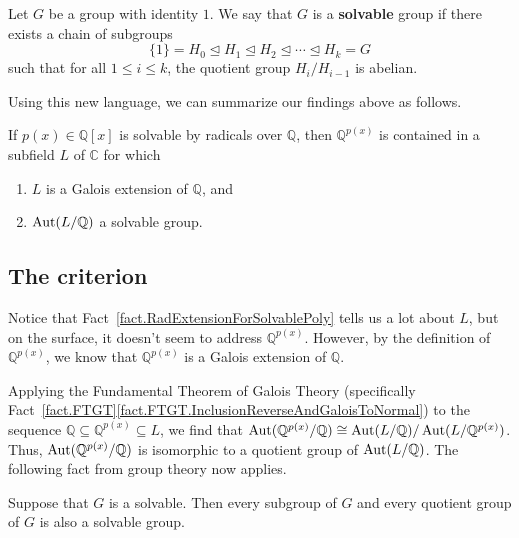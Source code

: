 \begin{definition}\label{def.SolvableGroup}
Let $G$ be a group with identity $1$. We say that $G$ is a \textbf{solvable} group if there exists a chain of subgroups 
\[ \{1\} = H_0 \trianglelefteq H_1 \trianglelefteq H_2 \trianglelefteq \cdots \trianglelefteq H_k = G \]
such that for all $1\le i \le k$, the quotient group $H_i/H_{i-1}$ is abelian.
\end{definition}

Using this new language, we can summarize our findings above as follows. 

\begin{fact}\label{fact.RadExtensionForSolvablePoly}
If $p(x)\in \mathbb{Q}[x]$ is solvable by radicals over $\mathbb{Q}$, then $\mathbb{Q}^{p(x)}$ is contained in a subfield $L$ of $\mathbb{C}$ for which
\begin{enumerate}
\item $L$ is a Galois extension of $\mathbb{Q}$, and 
\item $\operatorname{Aut}(L/\mathbb{Q})$ a solvable group.
\end{enumerate} 
\end{fact}

\subsection{The criterion}

Notice that Fact~\ref{fact.RadExtensionForSolvablePoly} tells us a lot about $L$, but on the surface, it doesn't seem to address $\mathbb{Q}^{p(x)}$. However, by the definition of $\mathbb{Q}^{p(x)}$, we know that $\mathbb{Q}^{p(x)}$ is a Galois extension of $\mathbb{Q}$. 

Applying the Fundamental Theorem of Galois Theory (specifically Fact~\ref{fact.FTGT}\ref{fact.FTGT.InclusionReverseAndGaloisToNormal}) to the sequence $\mathbb{Q} \subseteq \mathbb{Q}^{p(x)} \subseteq L$, we find that $\operatorname{Aut}(\mathbb{Q}^{p(x)}/\mathbb{Q})\cong \operatorname{Aut}(L/\mathbb{Q})/ \operatorname{Aut}(L/\mathbb{Q}^{p(x)})$. Thus, $\operatorname{Aut}(\mathbb{Q}^{p(x)}/\mathbb{Q})$ is isomorphic to a quotient group of $\operatorname{Aut}(L/\mathbb{Q})$. The following fact from group theory now applies. 

\begin{fact}
Suppose that $G$ is a solvable. Then every subgroup of $G$ and every quotient group of $G$ is also a solvable group.
\end{fact}

